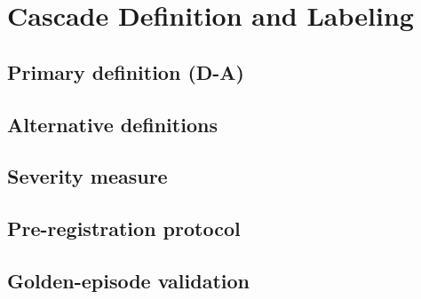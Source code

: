 \section{Cascade Definition and Labeling}\label{sec:cascadedef}

\subsection{Primary definition (D-A)}\label{sec:def-primary}

\subsection{Alternative definitions}\label{sec:def-alt}

\subsection{Severity measure}\label{sec:def-severity}

\subsection{Pre-registration protocol}\label{sec:def-prereg}

\subsection{Golden-episode validation}\label{sec:def-golden}
